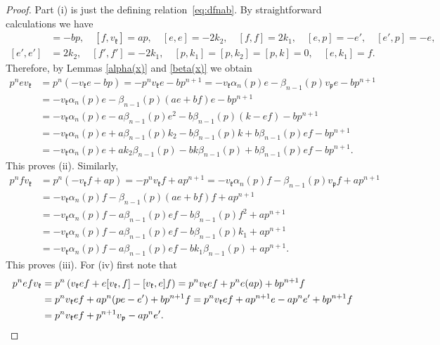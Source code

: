 \documentclass[11pt]{amsart}
\begin{document}
\begin{proof}
Part (i) is just the defining relation~\eqref{eq:dfnab}. By straightforward calculations we have
\begin{align*}
[e,v_{\mathfrak k}]&=-bp, \quad [f,v_{\mathfrak k}]=ap,\quad [e,e]=-2k_2,\quad [f,f]=2k_1,\quad [e,p]=-e',\quad [e',p]=-e,\\
[e',e']&=2k_2,\quad [f',f']=-2k_1,\quad [p,k_1]=[p,k_2]=[p,k]=0,\quad [e,k_1]=f.
\end{align*}
Therefore, by Lemmas \ref{alpha(x)} and \ref{beta(x)} we obtain
\begin{align*}
p^nev_{\mathfrak k}
&=p^n(-v_{\mathfrak k}e-bp)=-p^nv_{\mathfrak k}e-bp^{n+1}=-v_{\mathfrak k}\alpha_{n}(p)e-\beta_{n-1}(p)v_{\mathfrak p}e-bp^{n+1}\\
&=-v_{\mathfrak k}\alpha_{n}(p)e-\beta_{n-1}(p)(ae+bf)e-bp^{n+1}\\
&=-v_{\mathfrak k}\alpha_{n}(p)e-a\beta_{n-1}(p)e^2-b\beta_{n-1}(p)(k-ef)-bp^{n+1}\\
&=-v_{\mathfrak k}\alpha_{n}(p)e+a\beta_{n-1}(p)k_2-b\beta_{n-1}(p)k+b\beta_{n-1}(p)ef-bp^{n+1}\\
&=-v_{\mathfrak k}\alpha_{n}(p)e+ak_2\beta_{n-1}(p)-bk\beta_{n-1}(p)+b\beta_{n-1}(p)ef-bp^{n+1}.
\end{align*}
This proves (ii). Similarly, 
\begin{align*}
  p^nfv_{\mathfrak k}&
=p^n(-v_{\mathfrak k}f+ap)=-p^nv_{\mathfrak k}f+a
p^{n+1}=-v_{\mathfrak k}\alpha_{n}(p)f-\beta_{n-1}(p)v_{\mathfrak p}f+ap^{n+1}\\
&=-v_{\mathfrak k}\alpha_{n}(p)f-\beta_{n-1}(p)(ae+bf)f+ap^{n+1}\\
&=-v_{\mathfrak k}\alpha_{n}(p)f-a\beta_{n-1}(p)ef-b\beta_{n-1}(p)f^2+ap^{n+1}\\
&=-v_{\mathfrak k}\alpha_{n}(p)f-a\beta_{n-1}(p)ef-b\beta_{n-1}(p)k_1+ap^{n+1}\\
&=-v_{\mathfrak k}\alpha_{n}(p)f-a\beta_{n-1}(p)ef-bk_1\beta_{n-1}(p)+ap^{n+1}.
\end{align*}
This proves (iii). For (iv) first note that 
\begin{align}
\label{eq:soim}
\notag
 p^nefv_{\mathfrak k}&=p^n\left(v_{\mathfrak k}ef+e[v_{\mathfrak k},f]-[v_{\mathfrak k},e]f\right)=p^nv_{\mathfrak k}ef+p^ne(ap)+bp^{n+1}f\\
&=p^nv_{\mathfrak k}ef+ap^n(pe-e')+bp^{n+1}f=p^nv_{\mathfrak k}ef+ap^{n+1}e-ap^ne'+bp^{n+1}f\\
&=p^nv_{\mathfrak k}ef+p^{n+1}v_{\mathfrak p}-ap^ne'.
\notag
\end{align}

\end{proof}
\end{document}
